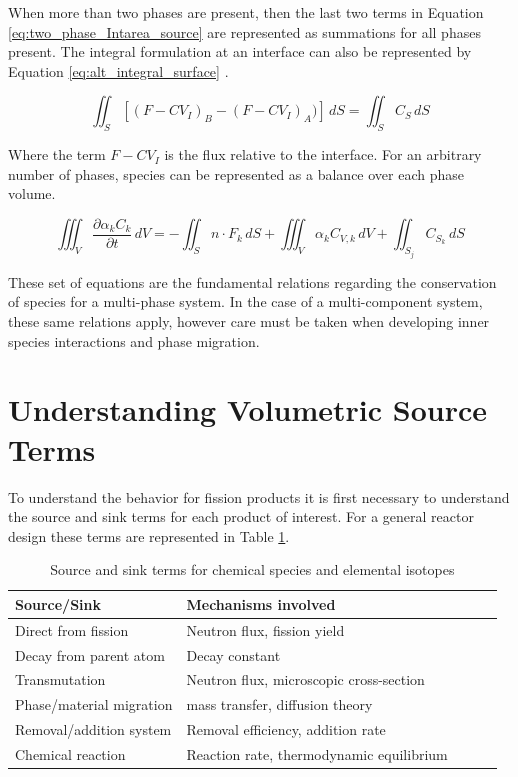 When more than two phases are present, then the last two terms in Equation \ref{eq:two_phase_Intarea_source} are represented as summations for all phases present. The integral formulation at an interface can also be represented by Equation \ref{eq:alt_integral_surface} \cite{deen2016}.

\begin{equation}
	 \iint_S [(F - CV_{I})_{B} - (F - CV_{I})_{A})]\,dS = \iint_S C_{S} \,dS
	\label{eq:alt_integral_surface}
\end{equation}

Where the term $F - CV_{I}$ is the flux relative to the interface. For an arbitrary number of phases, species can be represented as a balance over each phase volume. 

\begin{equation}
	\iiint_{V} \frac{\partial \alpha_{k}C_{k} }{\partial t}\,dV = -\iint_S n \cdot F_{k} \,dS + \iiint_V \alpha_{k}C_{V,k} \,dV + \iint_{S_{j}} C_{S_{k}} \,dS
	\label{eq:two_phase_species_con_integral_volume}
\end{equation}

These set of equations are the fundamental relations regarding the conservation of species for a multi-phase system. In the case of a multi-component system, these same relations apply, however care must be taken when developing inner species interactions and phase migration. 

\section{Understanding Volumetric Source Terms} \label{source_terms}
To understand the behavior for fission products it is first necessary to understand the source and sink terms for each product of interest. For a general reactor design these terms are represented in Table \ref{tab:volume_source_terms}\cite{houtzeel1967}. 

\begin{table}[htbp!]
   \caption{\label{tab:volume_source_terms} Source and sink terms for chemical species and elemental isotopes}
   \centering
   \begin{tabular}{l llll}
   \hline
   \textbf{Source/Sink} & \textbf{Mechanisms involved}\\
   \hline 
   Direct from fission & Neutron flux, fission yield \\[1ex]
   Decay from parent atom & Decay constant \\[1ex]
   Transmutation & Neutron flux, microscopic cross-section \\[1ex]
   Phase/material migration & mass transfer, diffusion theory \\[1ex]
   Removal/addition system & Removal efficiency, addition rate \\[1ex]
   Chemical reaction & Reaction rate, thermodynamic equilibrium \\[1ex]
   \hline
   \end{tabular}
\end{table}

